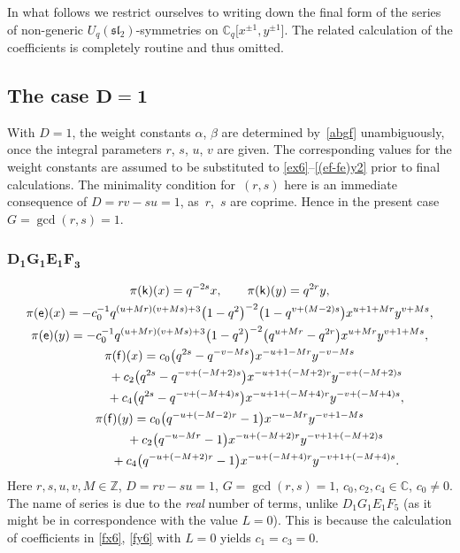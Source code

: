 \documentclass[10pt,a4paper]{amsart}
\numberwithin{equation}{section}
\begin{document}
In what follows we restrict ourselves to writing down the final form of the series of non-generic $U_q(\mathfrak{sl}_2)$-symmetries on $\mathbb{C}_q\big[x^{\pm 1},y^{\pm 1}\big]$. The related calculation of the coefficients is completely routine and thus omitted.

\subsection[The case $D=1$]{The case $\boldsymbol{D=1}$}

With $D=1$, the weight constants $\alpha$, $\beta$ are determined by~\eqref{abgf} unambiguously, once the integral parameters $r$, $s$, $u$, $v$ are given. The corresponding values for the weight constants are assumed to be substituted to \eqref{ex6}--\eqref{(ef-fe)y2} prior to final calculations. The minimality condition for~$(r,s)$ here is an immediate consequence of $D=rv-su=1$, as~$r$,~$s$ are coprime. Hence in the present case $G=\operatorname{gcd}(r,s)=1$.

\subsubsection*{$\boldsymbol{D_1G_1E_1F_3}$}
\begin{gather*}
\pi(\mathsf{k})(x)= q^{-2s}x,\qquad\pi(\mathsf{k})(y)=q^{2r}y, \\
\pi(\mathsf{e})(x)=-c_0^{-1}q^{(u+Mr)(v+Ms)+3}\big(1-q^2\big)^{-2}\big(1-q^{v+(M-2)s}\big)x^{u+1+Mr}y^{v+Ms},\\
\pi(\mathsf{e})(y)=-c_0^{-1}q^{(u+Mr)(v+Ms)+3}\big(1-q^2\big)^{-2}\big(q^{u+Mr}-q^{2r}\big)x^{u+Mr}y^{v+1+Ms}, \\
\pi(\mathsf{f})(x)=c_0\big(q^{2s}-q^{-v-Ms}\big)x^{-u+1-Mr}y^{-v-Ms}\\
\hphantom{\pi(\mathsf{f})(x)=}{}+ c_2\big(q^{2s}-q^{-v+(-M+2)s}\big)x^{-u+1+(-M+2)r}y^{-v+(-M+2)s}\\
\hphantom{\pi(\mathsf{f})(x)=}{}+ c_4\big(q^{2s}-q^{-v+(-M+4)s}\big)x^{-u+1+(-M+4)r}y^{-v+(-M+4)s}, \\
\pi(\mathsf{f})(y)=c_0\big(q^{-u+(-M-2)r}-1\big)x^{-u-Mr}y^{-v+1-Ms}\\
\hphantom{\pi(\mathsf{f})(y)=}{}+ c_2\big(q^{-u-Mr}-1\big)x^{-u+(-M+2)r}y^{-v+1+(-M+2)s}\\
\hphantom{\pi(\mathsf{f})(y)=}{}+c_4\big(q^{-u+(-M+2)r}-1\big)x^{-u+(-M+4)r}y^{-v+1+(-M+4)s}.
\end{gather*}
Here $r,s,u,v,M\in\mathbb{Z}$, $D=rv-su=1$, $G=\operatorname{gcd}(r,s)=1$, $c_0,c_2,c_4\in\mathbb{C}$, $c_0\ne 0$. The name of series is due to the {\it real} number of terms, unlike $D_1G_1E_1F_5$ (as it might be in correspondence with the value $L=0$). This is because the calculation of coefficients in \eqref{fx6}, \eqref{fy6} with $L=0$ yields $c_1=c_3=0$.
\end{document}
